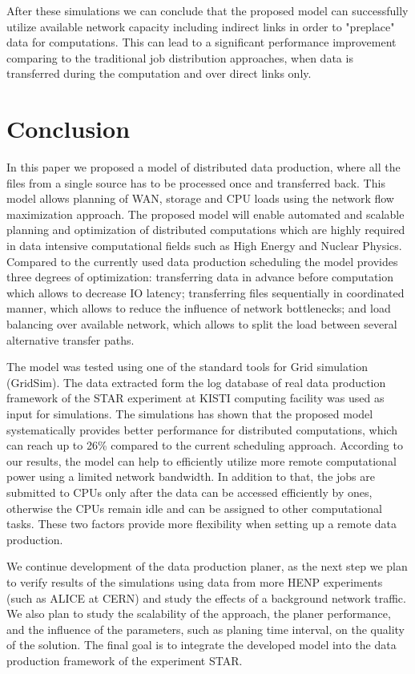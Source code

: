 \documentclass{svjour3}                     %
\begin{document}
After these simulations we can conclude that the proposed model can successfully utilize available network capacity including indirect links in order to "preplace" data for computations. This can lead to a significant performance improvement comparing to the traditional job distribution approaches, when data is transferred during the computation and over direct links only. 

\section{Conclusion}
\label{Conclusion}

In this paper we proposed a model of distributed data production, where all
the files from a single source has to be processed once and transferred back.
This model allows planning of WAN, storage and CPU loads using the network
flow maximization approach. The proposed model will enable automated and scalable planning and optimization of distributed computations which are highly required in data intensive computational fields such as High Energy and Nuclear Physics. Compared to the currently used data production scheduling the model provides three degrees of optimization: transferring data in advance before computation which allows to decrease IO latency; transferring  files sequentially in coordinated manner, which allows to reduce the influence of network bottlenecks; and load balancing over available network, which allows to split the load between several alternative transfer paths.

The model was tested using one of the standard tools for Grid simulation (GridSim). The data extracted form the log database of real data production framework of the STAR experiment at KISTI computing facility was used as input for simulations. The simulations has shown that the proposed model systematically provides better performance for distributed computations, which can reach up to 26\% compared to the current scheduling approach. According to our results, the model can help to efficiently utilize more remote computational power using a limited network bandwidth. In addition to that, the jobs are submitted to CPUs only after the data can be accessed efficiently by ones, otherwise the CPUs remain idle and can be assigned to other computational tasks. These two factors provide more flexibility when setting up a remote data production.

We continue development of the data production planer, as the next step we plan to verify results of the simulations using data from more HENP experiments (such as ALICE at CERN) and study the effects of a background network traffic. We also plan to study the scalability of the approach, the planer performance, and the influence of the parameters, such as planing time interval, on the quality of the solution. The final goal is to integrate the developed model into the data production framework of the experiment STAR.
\end{document}
